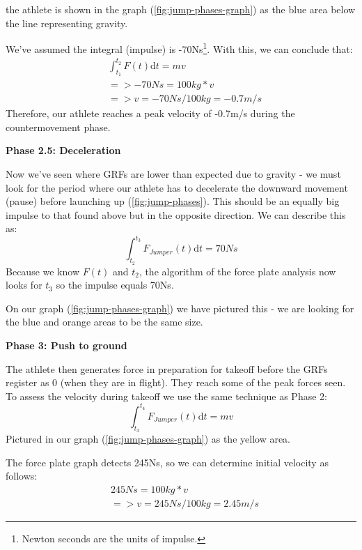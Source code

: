 the athlete is shown in the graph (\cref{fig:jump-phases-graph}) as the blue area
below the line representing gravity.
\par
We've assumed the integral (impulse) is -70Ns\footnote{Newton seconds are the units of impulse.}. 
With this, we can conclude that:
\begin{align*}
& \int_{t_1}^{t_2} F(t) \mathrm{d}t = m v \\
&=> -70 N s = 100kg * v \\
&=> v = -70 N s / 100kg = -0.7 m/s
\end{align*}
Therefore, our athlete reaches a peak velocity of -0.7m/s during the countermovement phase.
\par
\textbf{Phase 2.5: Deceleration}
\par
Now we've seen where GRFs are lower than expected due to gravity - we must look for the period
where our athlete has to decelerate the downward movement (pause) before launching up (\cref{fig:jump-phases}).
This should be an equally big impulse to that found above but in the opposite direction.
We can describe this as:
\[\displaystyle \int_{t_2}^{t_3} F_{Jumper}(t) \mathrm{d}t = 70 Ns\]
Because we know $F(t)$ and $t_2$, the algorithm of the force plate analysis
now looks for $t_3$ so the impulse equals 70Ns.
\par
On our graph (\cref{fig:jump-phases-graph}) we have pictured this -
we are looking for the blue and orange areas to be the same size.
\par
\textbf{Phase 3: Push to ground}
\par
The athlete then generates force in preparation for takeoff before the GRFs register as 0
(when they are in flight). They reach some of the peak forces seen.
To assess the velocity during takeoff we use the same technique as Phase 2:
\[
\displaystyle
\int_{t_3}^{t_4} F_{Jumper}(t) \mathrm{d}t = mv	
\]
Pictured in our graph (\cref{fig:jump-phases-graph}) as the yellow area.
\pagebreak

The force plate graph detects 245Ns, so we can determine initial velocity as follows:
\vspace{-3mm}
\begin{align*}
	& 245 N s = 100kg * v \\
	&=> v = 245 N s / 100kg = 2.45 m/s
\end{align*}
\vspace{-5mm}

